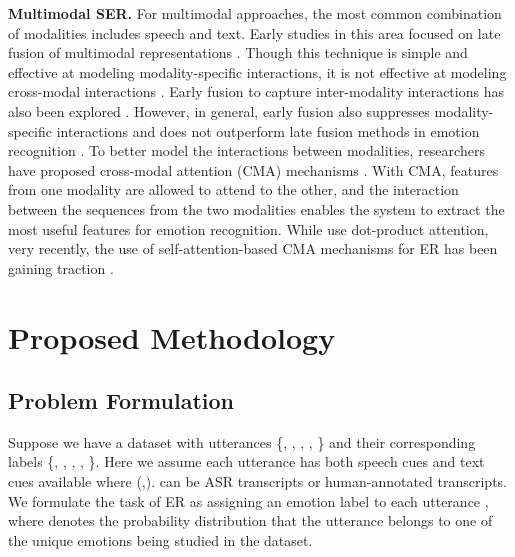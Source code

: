 \documentclass{INTERSPEECH2023}
\begin{document}
{\noindent \textbf{Multimodal SER.}} For multimodal approaches, the most common combination of modalities includes speech and text. Early studies in this area focused on late fusion of multimodal representations \cite{tripathi2018multi,poria2017context,wu2021emotion}. Though this technique is simple and effective at modeling modality-specific interactions, it is not effective at modeling cross-modal interactions \cite{wang2019words}. Early fusion to capture inter-modality interactions has also been explored \cite{sebastian2019fusion}. However, in general, early fusion also suppresses modality-specific interactions and does not outperform late fusion methods in emotion recognition \cite{wang2019words,poria2018multimodal}. To better model the interactions between modalities, researchers have proposed cross-modal attention (CMA) mechanisms \cite{choi2018convolutional,xu2019learning,krishna2020multimodal,chen2021key}. With CMA, features from one modality are allowed to attend to the other, and the interaction between the sequences from the two modalities enables the system to extract the most useful features for emotion recognition. While \cite{choi2018convolutional,xu2019learning} use dot-product attention, very recently, the use of self-attention-based CMA mechanisms for ER has been gaining traction \cite{krishna2020multimodal,pan2020multi,chen2021key}. 
























\section{Proposed Methodology}

\subsection{Problem Formulation}
Suppose we have a dataset  with  utterances \{\textsubscript{}, \textsubscript{}, \textsubscript{}, , \textsubscript{}\} and their corresponding labels \{\textsubscript{}, \textsubscript{}, \textsubscript{}, , \textsubscript{}\}. Here we assume each utterance  has both speech cues  and text cues  available where   (,).  can be ASR transcripts or human-annotated transcripts. We formulate the task of ER as assigning an emotion label  to each utterance , where  denotes the probability distribution that the utterance belongs to one of the  unique emotions being studied in the dataset.
\end{document}
